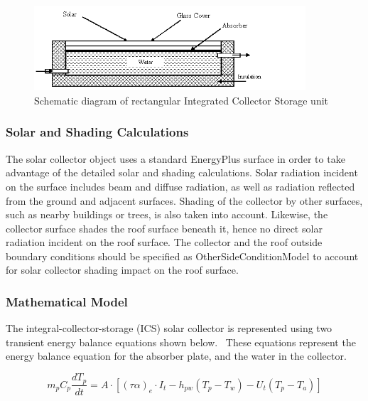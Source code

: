 \begin{figure}[hbtp] %
\centering
\includegraphics[width=0.9\textwidth, height=0.9\textheight, keepaspectratio=true]{media/image6502.png}
\caption{Schematic diagram of rectangular Integrated Collector Storage unit \protect \label{fig:schematic-diagram-of-rectangular-integrated}}
\end{figure}

\subsubsection{Solar and Shading Calculations}\label{solar-and-shading-calculations-1}

The solar collector object uses a standard EnergyPlus surface in order to take advantage of the detailed solar and shading calculations. Solar radiation incident on the surface includes beam and diffuse radiation, as well as radiation reflected from the ground and adjacent surfaces. Shading of the collector by other surfaces, such as nearby buildings or trees, is also taken into account. Likewise, the collector surface shades the roof surface beneath it, hence no direct solar radiation incident on the roof surface. The collector and the roof outside boundary conditions should be specified as OtherSideConditionModel to account for solar collector shading impact on the roof surface.

\subsubsection{Mathematical Model}\label{mathematical-model}

The integral-collector-storage (ICS) solar collector is represented using two transient energy balance equations shown below.~ These equations represent the energy balance equation for the absorber plate, and the water in the collector.

\begin{equation}
{m_p}{C_p}\frac{{d{T_p}}}{{dt}} = A \cdot \left[ {{{\left( {\tau \alpha } \right)}_e} \cdot {I_t} - {h_{pw}}\left( {{T_p} - {T_w}} \right) - {U_t}\left( {{T_p} - {T_a}} \right)} \right]
\end{equation}

